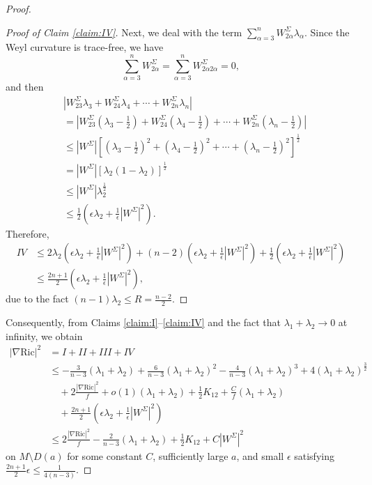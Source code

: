 \documentclass[a4, 12pt]{amsart}
\theoremstyle{plain}
\begin{document}
\begin{proof}
\begin{proof}[Proof of Claim \ref{claim:IV}]
		Next, we deal with the term $\sum_{\alpha=3}^n W^{\Sigma}_{2\alpha}\lambda_{\alpha}$. Since the Weyl curvature is trace-free, we have
		\[
		\sum_{\alpha=3}^n W^{\Sigma}_{2\alpha} = \sum_{\alpha=3}^n W^{\Sigma}_{2\alpha 2\alpha} = 0,
		\]
		and then
		\begin{equation}\label{eq:w2a}
			\begin{aligned}
				&|W^{\Sigma}_{23}\lambda_{3} + W^{\Sigma}_{24}\lambda_{4} + \cdots + W^{\Sigma}_{2n}\lambda_{n}| \\
				&= \left|W^{\Sigma}_{23}\left(\lambda_{3} - \frac{1}{2}\right) + W^{\Sigma}_{24}\left(\lambda_{4} - \frac{1}{2}\right) + \cdots + W^{\Sigma}_{2n}\left(\lambda_{n} - \frac{1}{2}\right)\right| \\
				&\leq |W^{\Sigma}|\left[\left(\lambda_{3} - \frac{1}{2}\right)^2 + \left(\lambda_{4} - \frac{1}{2}\right)^2 + \cdots + \left(\lambda_{n} - \frac{1}{2}\right)^2\right]^{\frac{1}{2}} \\
				&= |W^{\Sigma}|[\lambda_{2}(1-\lambda_2)]^{\frac{1}{2}} \\
				&\leq |W^{\Sigma}|\lambda_{2}^{\frac{1}{2}} \\
				&\leq \frac{1}{2}\left(\epsilon\lambda_2 + \frac{1}{\epsilon}|W^{\Sigma}|^2\right).
			\end{aligned}
		\end{equation}
		Therefore,
		\begin{align*}
			IV &\leq 2\lambda_{2}\left(\epsilon\lambda_2 + \frac{1}{\epsilon}|W^{\Sigma}|^2\right) + (n-2)\left(\epsilon\lambda_2 + \frac{1}{\epsilon}|W^{\Sigma}|^2\right) + \frac{1}{2}\left(\epsilon\lambda_2 + \frac{1}{\epsilon}|W^{\Sigma}|^2\right) \\
			&\leq \frac{2n+1}{2}\left(\epsilon\lambda_2 + \frac{1}{\epsilon}|W^{\Sigma}|^2\right),
		\end{align*}
		due to the fact $(n-1)\lambda_{2} \leq R = \frac{n-2}{2}$.
	\end{proof}
	
	Consequently, from Claims \ref{claim:I}--\ref{claim:IV} and the fact that $\lambda_1+\lambda_2 \to 0$ at infinity, we obtain
	\begin{align*}
		|\nabla \mathrm{Ric}|^2 &= I + II + III + IV \\
		&\leq -\frac{3}{n-3}(\lambda_{1}+\lambda_{2}) + \frac{6}{n-3}(\lambda_{1}+\lambda_{2})^2 - \frac{4}{n-3}(\lambda_{1}+\lambda_{2})^3 + 4(\lambda_{1}+\lambda_{2})^{\frac{3}{2}} \\
		&\quad + 2\frac{|\nabla \mathrm{Ric}|^2}{f} + o(1)(\lambda_1+\lambda_2) + \frac{1}{2}K_{12} + \frac{C}{f}(\lambda_{1}+\lambda_{2}) \\
		&\quad + \frac{2n+1}{2}\left(\epsilon\lambda_2 + \frac{1}{\epsilon}|W^{\Sigma}|^2\right) \\
		&\leq 2\frac{|\nabla \mathrm{Ric}|^2}{f} - \frac{2}{n-3}(\lambda_1+\lambda_2) + \frac{1}{2}K_{12} + C|W^{\Sigma}|^2
	\end{align*}
	on $M \setminus D(a)$ for some constant $C$, sufficiently large $a$, and small $\epsilon$ satisfying $\frac{2n+1}{2}\epsilon \leq \frac{1}{4(n-3)}$.
	

\end{proof}
\end{document}
